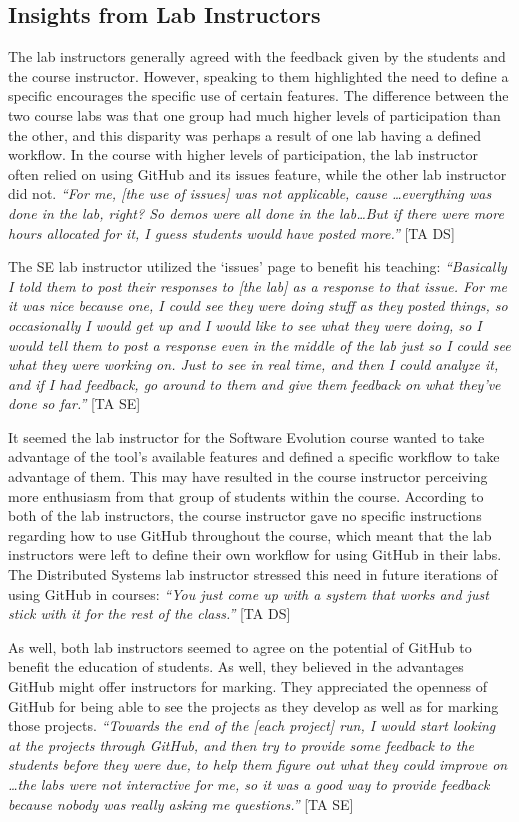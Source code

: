 \subsection{Insights from Lab Instructors}
The lab instructors generally agreed with the feedback given by the students and the course instructor. However, speaking to them highlighted the need to define a specific encourages the specific use of certain features. The difference between the two course labs was that one group had much higher levels of participation than the other, and this disparity was perhaps a result of one lab having a defined workflow. In the course with higher levels of participation, the lab instructor often relied on using GitHub and its issues feature, while the other lab instructor did not. \textit{``For me, [the use of issues] was not applicable, cause \ldots everything was done in the lab, right? So demos were all done in the lab\ldots But if there were more hours allocated for it, I guess students would have posted more.''} [TA DS]

The SE lab instructor utilized the `issues' page to benefit his teaching: \textit{``Basically I told them to post their responses to [the lab] as a response to that issue. For me it was nice because one, I could see they were doing stuff as they posted things, so occasionally I would get up and I would like to see what they were doing, so I would tell them to post a response even in the middle of the lab just so I could see what they were working on. Just to see in real time, and then I could analyze it, and if I had feedback, go around to them and give them feedback on what they've done so far.''} [TA SE]

It seemed the lab instructor for the Software Evolution course wanted to take advantage of the tool's available features and defined a specific workflow to take advantage of them. This may have resulted in the course instructor perceiving more enthusiasm from that group of students within the course. According to both of the lab instructors, the course instructor gave no specific instructions regarding how to use GitHub throughout the course, which meant that the lab instructors were left to define their own workflow for using GitHub in their labs. The Distributed Systems lab instructor stressed this need in future iterations of using GitHub in courses: \textit{``You just come up with a system that works and just stick with it for the rest of the class.''} [TA DS]

As well, both lab instructors seemed to agree on the potential of GitHub to benefit the education of students. As well, they believed in the advantages GitHub might offer instructors for marking. They appreciated the openness of GitHub for being able to see the projects as they develop as well as for marking those projects. \textit{``Towards the end of the [each project] run, I would start looking at the projects through GitHub, and then try to provide some feedback to the students before they were due, to help them figure out what they could improve on \ldots the labs were not interactive for me, so it was a good way to provide feedback because nobody was really asking me questions.''} [TA SE]

